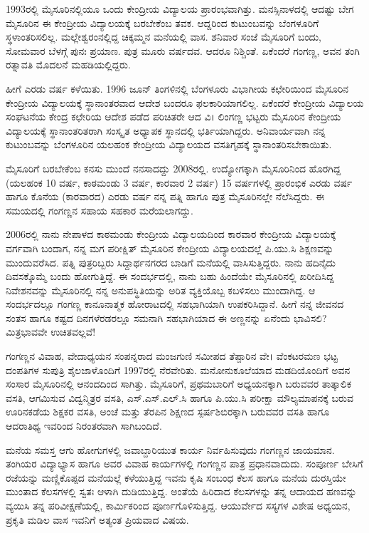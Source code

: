 {1993ರಲ್ಲಿ ಮೈಸೂರಿನಲ್ಲಿಯೂ ಒಂದು ಕೇಂದ್ರೀಯ ವಿದ್ಯಾಲಯ ಪ್ರಾರಂಭ\-ವಾಗಿತ್ತು. ಮನಸ್ಸಿನಾಳದಲ್ಲಿ ಆದಷ್ಟು ಬೇಗ ಮೈಸೂರಿನ ಈ ಕೇಂದ್ರೀಯ \hbox{ವಿದ್ಯಾಲಯಕ್ಕೆ} ಬರಬೇಕೆಂಬ ತವಕ. ಆದ್ದರಿಂದ ಕುಟುಂಬವನ್ನು ಬೆಂಗಳೂರಿಗೆ ಸ್ಥಳಾಂತರಿಸಲಿಲ್ಲ. ಮಲ್ಲೇಶ್ವರಂನಲ್ಲಿದ್ದ ಚಿಕ್ಕಮ್ಮನ ಮನೆಯಲ್ಲಿ ವಾಸ. ಶನಿವಾರ ಸಂಜೆ ಮೈಸೂರಿಗೆ ಬಂದು, ಸೋಮವಾರ ಬೆಳಗ್ಗೆ ಪುನಃ ಪ್ರಯಾಣ. ಪುತ್ರ ಮೂರು ವರ್ಷದವ. ಆದರೂ ನಿಶ್ಚಿಂತೆ. ಏಕೆಂದರೆ ಗಂಗಣ್ಣ, ಅವನ ತಂಗಿ ರತ್ನಾವತಿ ಮೊದಲನೆ ಮಹಡಿಯಲ್ಲಿದ್ದರು.

ಹೀಗೆ ಎರಡು ವರ್ಷ ಕಳೆಯಿತು. 1996 ಜೂನ್ ತಿಂಗಳಿನಲ್ಲಿ ಬೆಂಗಳೂರು \hbox{ವಿಭಾಗೀಯ} ಕಛೇರಿಯಿಂದ \hbox{ಮೈಸೂರಿನ} ಕೇಂದ್ರೀಯ ವಿದ್ಯಾಲಯಕ್ಕೆ ಸ್ಥಾನಾಂತರವಾದ ಆದೇಶ ಬಂದರೂ ಫಲಕಾರಿಯಾಗಲಿಲ್ಲ. ಏಕೆಂದರೆ ಕೇಂದ್ರೀಯ ವಿದ್ಯಾಲಯ ಸಂಘಟ\-ನೆಯ ಕೇಂದ್ರ ಕಛೇರಿಯ ಆದೇಶ ಪಡೆದ ಪರಿಚಿತರೇ ಆದ ವಿ। ಲಿಂಗಣ್ಣ ಭಟ್ಟರು \hbox{ಮೈಸೂರಿನ} ಕೇಂದ್ರೀಯ ವಿದ್ಯಾಲಯಕ್ಕೆ ಸ್ಥಾನಾಂತರಿತರಾಗಿ ಸಂಸ್ಕೃತ \hbox{ಅಧ್ಯಾಪಕ} \hbox{ಸ್ಥಾನದಲ್ಲಿ} ಭರ್ತಿಯಾಗಿದ್ದರು. ಅನಿವಾರ್ಯವಾಗಿ ನನ್ನ ಕುಟುಂಬವನ್ನು \hbox{ಬೆಂಗಳೂರಿನ} ಯಲಹಂಕ ಕೇಂದ್ರೀಯ ವಿದ್ಯಾಲಯದ ವಸತಿಗೃಹಕ್ಕೆ ಸ್ಥಾನಾಂತರಿಸಬೇಕಾಯಿತು.

ಮೈಸೂರಿಗೆ ಬರಬೇಕೆಂಬ ಕನಸು ಮುಂದೆ ನನಸಾದದ್ದು 2008ರಲ್ಲಿ. ಉದ್ಯೋಗಕ್ಕಾಗಿ ಮೈಸೂರಿನಿಂದ ಹೊರಗಿದ್ದ (ಯಲಹಂಕ   \enginline{-}   10 ವರ್ಷ, ಕಾಠಮಂಡು   \enginline{-}   3 ವರ್ಷ, ಕಾರವಾರ   \enginline{-}   2 ವರ್ಷ) 15 ವರ್ಷಗಳಲ್ಲಿ ಪ್ರಾರಂಭಿಕ ಎರಡು ವರ್ಷ ಹಾಗೂ ಕೊನೆಯ (ಕಾರವಾರದ) ಎರಡು ವರ್ಷ ನನ್ನ ಪತ್ನಿ ಹಾಗೂ ಪುತ್ರ ಮೈಸೂರಿನಲ್ಲೇ ನೆಲೆಸಿದ್ದರು. ಈ ಸಮಯದಲ್ಲಿ ಗಂಗಣ್ಣನ ಸಹಾಯ  \enginline{-}  ಸಹಕಾರ ಮರೆಯಲಾಗದ್ದು.

2006ರಲ್ಲಿ ನಾನು ನೇಪಾಳದ ಕಾಠಮಂಡು ಕೇಂದ್ರೀಯ ವಿದ್ಯಾಲಯದಿಂದ \hbox{ಕಾರವಾರ} ಕೇಂದ್ರೀಯ ವಿದ್ಯಾಲಯಕ್ಕೆ ವರ್ಗವಾಗಿ ಬಂದಾಗ, ನನ್ನ ಮಗ ಪರೀಕ್ಷಿತ್ \hbox{ಮೈಸೂರಿನ} ಕೇಂದ್ರೀಯ ವಿದ್ಯಾಲಯದಲ್ಲೆ ಪಿ.ಯು.ಸಿ ಶಿಕ್ಷಣವನ್ನು ಮುಂದುವರೆಸಿದ. ಪತ್ನಿ ಪುತ್ರರಿಬ್ಬರು ಸಿದ್ದಾರ್ಥನಗರದ ಬಾಡಿಗೆ ಮನೆಯಲ್ಲಿ ವಾಸಿಸುತ್ತಿದ್ದರು. ನಾನು ಹದಿನೈದು ದಿವಸಕ್ಕೊಮ್ಮೆ ಬಂದು  \enginline{-}  ಹೋಗುತ್ತಿದ್ದೆ. ಈ ಸಂದರ್ಭದಲ್ಲಿ, ನಾನು ಬಹು ಹಿಂದೆಯೇ ಮೈಸೂರಿನಲ್ಲಿ ಖರೀದಿಸಿದ್ದ ನಿವೇಶನವನ್ನು ಮೈಸೂರಿನಲ್ಲಿ ನನ್ನ ಅನುಪಸ್ಥಿತಿಯನ್ನು ಅರಿತ ವ್ಯಕ್ತಿಯೊಬ್ಬ ಕಬಳಿಸಲು ಮುಂದಾಗಿದ್ದ. ಆ ಸಂದರ್ಭದಲ್ಲೂ ಗಂಗಣ್ಣ ಕಾನೂನಾತ್ಮಕ ಹೋರಾಟದಲ್ಲಿ ಸಹಭಾಗಿಯಾಗಿ ಉಪಕರಿಸಿದ್ದಾನೆ. ಹೀಗೆ ನನ್ನ ಜೀವನದ ಸಂತಸ ಹಾಗೂ ಕಷ್ಟದ ದಿನಗಳೆರಡರಲ್ಲೂ ಸಮನಾಗಿ ಸಹಭಾಗಿಯಾದ ಈ ಅಣ್ಣನನ್ನು ಏನೆಂದು ಭಾವಿಸಲಿ? ಮಿತ್ರಭಾವವೇ ಉಚಿತವಲ್ಲವೆ!

ಗಂಗಣ್ಣನ ವಿವಾಹ, ವೇದಾಧ್ಯಯನ ಸಂಪನ್ನರಾದ ಮಂಜಗುಣಿ ಸಮೀಪದ ತೆಪ್ಪಾರಿನ ವೇ। ವೆಂಕಟರಮಣ ಭಟ್ಟ ದಂಪತಿಗಳ ಸುಪುತ್ರಿ ಶೈಲಜಾಳೊಂದಿಗೆ 1997ರಲ್ಲಿ ನೆರವೇರಿತು. ಮನೋನುಕೂಲೆಯಾದ ಮಡದಿಯೊಂದಿಗೆ ಅವನ ಸಂಸಾರ ಮೈಸೂರಿನಲ್ಲಿ ಆನಂದದಿಂದ ಸಾಗಿತ್ತು. ಮೈಸೂರಿಗೆ, ಪ್ರಥಮಬಾರಿಗೆ ಅಧ್ಯಯನಕ್ಕಾಗಿ ಬರುವವರ ತಾತ್ಕಾಲಿಕ ವಸತಿ, ಆಗಮಿಸುವ ವಿದ್ವನ್ಮಿತ್ರರ ವಸತಿ, ಎಸ್.ಎಸ್.ಎಲ್.ಸಿ ಹಾಗೂ ಪಿ.ಯು.ಸಿ ಪರೀಕ್ಷಾ ಮೌಲ್ಯಮಾಪನಕ್ಕೆ ಬರುವ ಊರಿನಕಡೆಯ ಶಿಕ್ಷಕರ ವಸತಿ, ಅಂಚೆ ಮತ್ತು ತೆರಪಿನ ಶಿಕ್ಷಣದ ಸ್ಪರ್ಷಶಿಬಿರಕ್ಕಾಗಿ ಬರುವವರ ವಸತಿ ಹಾಗೂ ಆದರಾತಿಥ್ಯ ಇವರಿಂದ ನಿರಂತರವಾಗಿ ಸಾಗಿಬಂದಿದೆ.

ಮನೆಯ ಸಮಸ್ತ ಆಗು  \enginline{-}  ಹೋಗುಗಳಲ್ಲಿ ಜವಾಬ್ದಾರಿಯುತ ಕಾರ್ಯ ನಿರ್ವಹಿಸುವುದು ಗಂಗಣ್ಣನ ಜಾಯಮಾನ. ತಂಗಿಯರ ವಿದ್ಯಾಭ್ಯಾಸ ಹಾಗೂ ಅವರ ವಿವಾಹ ಕಾರ್ಯಗಳಲ್ಲಿ ಗಂಗಣ್ಣನ ಪಾತ್ರ ಪ್ರಧಾನವಾದುದು. ಸಂಪೂರ್ಣ ಬೇಸಿಗೆ ರಜೆಯನ್ನು ಮಣ್ಣಿಕೊಪ್ಪದ ಮನೆಯಲ್ಲೆ ಕಳೆಯುತ್ತಿದ್ದ ಇವನು ಕೃಷಿ ಸಂಬಂಧ ಕೆಲಸ ಹಾಗೂ ಮನೆಯ ದುರಸ್ತಿಯೇ ಮುಂತಾದ ಕೆಲಸಗಳಲ್ಲಿ ಸ್ವತಃ ಆಳಾಗಿ ದುಡಿಯುತ್ತಿದ್ದ. ಅಂತೆಯೆ ಹಿರಿದಾದ ಕೆಲಸಗಳನ್ನು ತನ್ನ ಆದಾಯದ ಹಣವನ್ನು ವ್ಯಯಿಸಿ ತನ್ನ ಪರಿವೀಕ್ಷಣೆಯಲ್ಲಿ, ಕಾರ್ಮಿಕರಿಂದ ಪೂರ್ಣಗೊಳಿಸುತ್ತಿದ್ದ. ಆಯುರ್ವೇದ ಸಸ್ಯಗಳ ವಿಶೇಷ ಅಧ್ಯಯನ, ಪ್ರಕೃತಿ ಮಡಿಲ  ವಾಸ ಇವನಿಗೆ ಅತ್ಯಂತ ಪ್ರಿಯವಾದ ವಿಷಯ.

}
